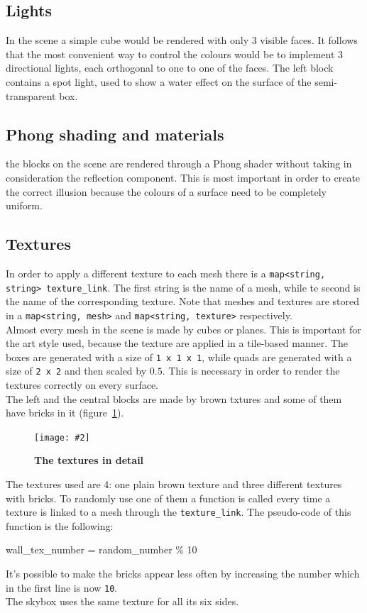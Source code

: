 \documentclass[10pt, a4paper]{article}
\newcommand{\figuremacro}[5]{
    \begin{figure}[#1]
        \centering
        \texttt{[image: \#2]}
        \caption[#3]{\textbf{#3}#4}
        \label{fig:#2}
    \end{figure}
}
\begin{document}
\subsection{Lights}
In the scene a simple cube would be rendered with only 3 visible faces. It follows that the most convenient way to control the colours would be to implement 3 directional lights, each orthogonal to one to one of the faces.
The left block contains a spot light, used to show a water effect on the surface of the semi-transparent box.

\subsection{Phong shading and materials}
the blocks on the scene are rendered through a Phong shader without taking in consideration the reflection component. This is most important in order to create the correct illusion because the colours of a surface need to be completely uniform.

\subsection{Textures}
In order to apply a different texture to each mesh there is a \texttt{map<string, string> texture\_link}. The first string is the name of a mesh, while te second is the name of the corresponding texture. Note that meshes and textures are stored in a \texttt{map<string, mesh>} and \texttt{map<string, texture>} respectively. \\
Almost every mesh in the scene is made by cubes or planes. This is important for the art style used, because the texture are applied in a tile-based manner. The boxes are generated with a size of \texttt{1 x 1 x 1}, while quads are generated with a size of \texttt{2 x 2} and then scaled by $0.5$. This is necessary in order to render the textures correctly on every surface.\\
The left and the central blocks are made by brown txtures and some of them have bricks in it (figure~\ref{fig:Capture05}).
\figuremacro{h}{Capture05}{The textures in detail}{}{1.0}
The textures used are 4: one plain brown texture and three different textures with bricks. To randomly use one of them a function is called every time a texture is linked to a mesh through the \texttt{texture\_link}. The pseudo-code of this function is the following:
\begin{algorithm}[h]
	wall\_tex\_number = random\_number \% 10\;
\end{algorithm}
It's possible to make the bricks appear less often by increasing the number which in the first line is now \texttt{10}.\\
The skybox uses the same texture for all its six sides.
\end{document}
